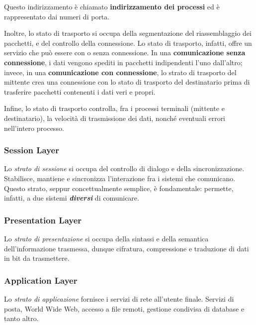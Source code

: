 \vspace{3mm}

Questo indirizzamento è chiamato \textbf{indirizzamento dei processi} ed è rappresentato dai numeri di porta.

\vspace{3mm}

Inoltre, lo stato di trasporto si occupa della segmentazione del riassemblaggio dei pacchetti, e del controllo della connessione. Lo stato di trasporto, infatti, offre un servizio che può essere con o senza connessione. In una \textbf{comunicazione senza connessione}, i dati vengono spediti in pacchetti indipendenti l'uno dall'altro; invece, in una \textbf{comunicazione con connessione}, lo strato di trasporto del mittente crea una connessione con lo stato di trasporto del destinatario prima di trasferire pacchetti contenenti i dati veri e propri.

Infine, lo stato di trasporto controlla, fra i processi terminali (mittente e destinatario), la velocità di trasmissione dei dati, nonché eventuali errori nell'intero processo.

\subsubsection{Session Layer}

Lo \textit{strato di sessione} si occupa del controllo di dialogo e della sincronizzazione. Stabilisce, mantiene e sincronizza l'interazione fra i sistemi che comunicano. Questo strato, seppur concettualmente semplice, è fondamentale: permette, infatti, a due sistemi \textit{\textbf{diversi}} di comunicare.

\subsubsection{Presentation Layer}

Lo \textit{strato di presentazione} si occupa della sintassi e della semantica dell'informazione trasmessa, dunque cifratura, compressione e traduzione di dati in bit da trasmettere.

\subsubsection{Application Layer}

Lo \textit{strato di applicazione} fornisce i servizi di rete all'utente finale. Servizi di posta, World Wide Web, accesso a file remoti, gestione condivisa di database e tanto altro.
